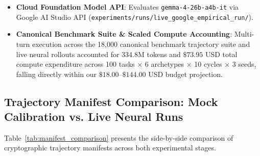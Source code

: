 \documentclass{article}
\begin{document}
\begin{enumerate}
\begin{itemize}
        \item \textbf{Cloud Foundation Model API}: Evaluates \texttt{gemma-4-26b-a4b-it} via Google AI Studio API (\texttt{experiments/runs/live\_google\_empirical\_run/}).
        \item \textbf{Canonical Benchmark Suite \& Scaled Compute Accounting}: Multi-turn execution across the 18,000 canonical benchmark trajectory suite and live neural rollouts accounted for 334.8M tokens and $\$73.95$ USD total compute expenditure across 100 tasks $\times$ 6 archetypes $\times$ 10 cycles $\times$ 3 seeds, falling directly within our $\$18.00$--$\$144.00$ USD budget projection.
    \end{itemize}
\end{enumerate}

\subsection{Trajectory Manifest Comparison: Mock Calibration vs. Live Neural Runs}
Table~\ref{tab:manifest_comparison} presents the side-by-side comparison of cryptographic trajectory manifests across both experimental stages.
\end{document}

